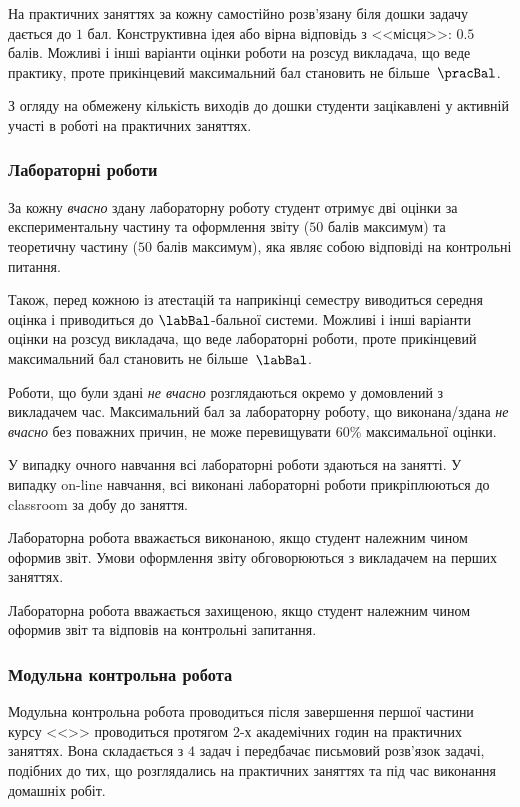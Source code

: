 \documentclass{Syllabus}
\begin{document}
На практичних заняттях за кожну самостійно розв’язану біля дошки задачу дається до $1$ бал. Конструктивна ідея або вірна відповідь з <<місця>>: $0.5$ балів. Можливі і інші варіанти оцінки роботи на розсуд викладача, що веде практику, проте прикінцевий максимальний бал становить не більше~$\pracBal$.

З огляду на обмежену кількість виходів до дошки студенти зацікавлені у активній участі в роботі на практичних заняттях.

\subsubsection*{Лабораторні роботи}

За кожну \emph{вчасно} здану лабораторну роботу студент отримує дві оцінки за експериментальну частину та оформлення звіту ($ 50 $ балів максимум) та теоретичну частину ($ 50 $ балів максимум), яка являє собою відповіді на контрольні питання.

Також, перед кожною із атестацій та наприкінці семестру виводиться середня оцінка  і приводиться до $ \labBal $-бальної системи. Можливі і інші варіанти оцінки на розсуд викладача, що веде лабораторні роботи, проте прикінцевий максимальний бал становить не більше~$\labBal$.

Роботи, що були здані \emph{не вчасно} розглядаються окремо у домовлений з викладачем час. Максимальний бал за лабораторну роботу, що виконана/здана \emph{не вчасно} без поважних причин, не може перевищувати 60\% максимальної оцінки.

У випадку очного навчання всі лабораторні роботи здаються на занятті. У випадку on-line навчання, всі виконані лабораторні роботи прикріплюються до classroom за добу до заняття.

Лабораторна робота вважається виконаною, якщо студент належним чином оформив звіт. Умови оформлення звіту обговорюються з викладачем на перших заняттях.

Лабораторна робота вважається захищеною, якщо студент належним чином оформив звіт та відповів на контрольні запитання.


\subsubsection*{Модульна контрольна робота}


Модульна контрольна робота проводиться після завершення першої частини курсу <<\discipline>> проводиться протягом 2-х академічних годин на практичних заняттях. Вона складається з $4$ задач і передбачає письмовий розв’язок задачі, подібних до тих, що розглядались на практичних заняттях та під час виконання домашніх робіт.
\end{document}
